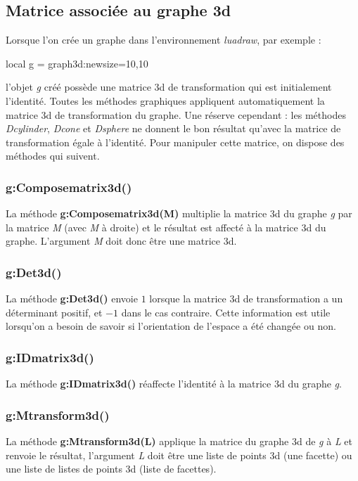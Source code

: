 \subsection{Matrice associée au graphe 3d}

Lorsque l'on crée un graphe dans l'environnement \emph{luadraw}, par exemple :
\begin{Luacode}
local g = graph3d:new{size={10,10}}
\end{Luacode}
l'objet \emph{g} créé possède une matrice 3d de transformation qui est initialement l'identité. Toutes les méthodes graphiques appliquent automatiquement la matrice 3d de transformation du graphe. Une réserve cependant : les méthodes \emph{Dcylinder}, \emph{Dcone} et \emph{Dsphere} ne donnent le bon résultat qu'avec la matrice de transformation égale à l'identité. Pour manipuler cette matrice, on dispose des méthodes qui suivent.

\subsubsection{g:Composematrix3d()}
La méthode \textbf{g:Composematrix3d(M)} multiplie la matrice 3d du graphe \emph g par la matrice \emph{M} (avec \emph{M} à droite) et le résultat est affecté à la matrice 3d du graphe. L'argument \emph{M} doit donc être une matrice 3d.

\subsubsection{g:Det3d()}
La méthode \textbf{g:Det3d()} envoie $1$ lorsque la matrice 3d de transformation a un déterminant positif, et $-1$ dans le cas contraire. Cette information est utile lorsqu'on a besoin de savoir si l'orientation de l'espace a été changée ou non.

\subsubsection{g:IDmatrix3d()}
La méthode \textbf{g:IDmatrix3d()} réaffecte l'identité à la matrice 3d du graphe \emph g.

\subsubsection{g:Mtransform3d()}
La méthode \textbf{g:Mtransform3d(L)} applique la matrice du graphe 3d de \emph g à \emph{L} et renvoie le résultat, l'argument \emph L doit être une liste de points 3d (une facette) ou une liste de listes de points 3d (liste de facettes).

